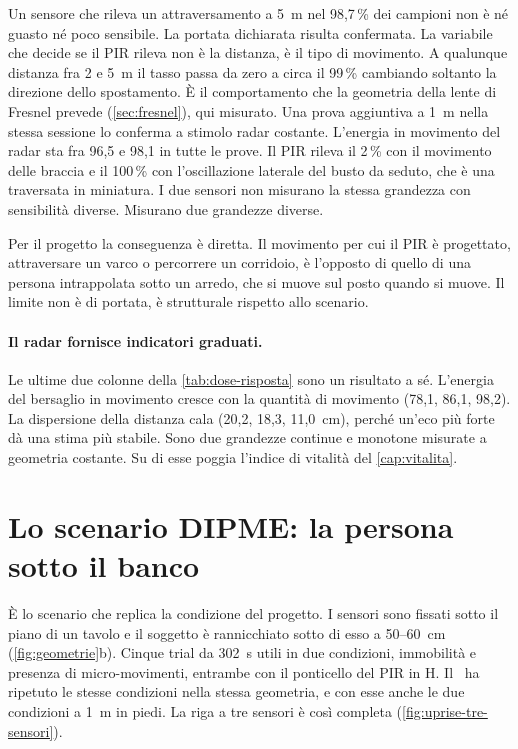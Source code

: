 Un sensore che rileva un attraversamento a 5~m nel 98,7\,\% dei campioni non è né
guasto né poco sensibile. La portata dichiarata risulta confermata. La variabile che
decide se il PIR rileva non è la distanza, è il tipo di movimento. A qualunque
distanza fra 2 e 5~m il tasso passa da zero a circa il 99\,\% cambiando soltanto la
direzione dello spostamento. È il comportamento che la geometria della lente di
Fresnel prevede (\cref{sec:fresnel}), qui misurato. Una prova aggiuntiva a 1~m nella
stessa sessione lo conferma a stimolo radar costante. L'energia in movimento del
radar sta fra 96,5 e 98,1 in tutte le prove. Il PIR rileva il 2\,\% con il movimento
delle braccia e il 100\,\% con l'oscillazione laterale del busto da seduto, che è una
traversata in miniatura. I due sensori non misurano la stessa grandezza con
sensibilità diverse. Misurano due grandezze diverse.

Per il progetto la conseguenza è diretta. Il movimento per cui il PIR è progettato,
attraversare un varco o percorrere un corridoio, è l'opposto di quello di una persona
intrappolata sotto un arredo, che si muove sul posto quando si muove. Il limite non è
di portata, è strutturale rispetto allo scenario.

\paragraph{Il radar fornisce indicatori graduati.} Le ultime due colonne della
\cref{tab:dose-risposta} sono un risultato a sé. L'energia del bersaglio in movimento
cresce con la quantità di movimento (78,1, 86,1, 98,2). La dispersione della distanza
cala (20,2, 18,3, 11,0~cm), perché un'eco più forte dà una stima più stabile. Sono due
grandezze continue e monotone misurate a geometria costante. Su di esse poggia
l'indice di vitalità del \cref{cap:vitalita}.

\section{Lo scenario DIPME: la persona sotto il banco}
\label{sec:sotto-banco}
\label{sec:gate-sotto-banco}

È lo scenario che replica la condizione del progetto. I sensori sono fissati sotto il
piano di un tavolo e il soggetto è rannicchiato sotto di esso a 50--60~cm
(\cref{fig:geometrie}b). Cinque trial da 302~s utili in due condizioni, immobilità e
presenza di micro-movimenti, entrambe con il ponticello del PIR in H. Il \ldc\ ha
ripetuto le stesse condizioni nella stessa geometria, e con esse anche le due
condizioni a 1~m in piedi. La riga a tre sensori è così completa
(\cref{fig:uprise-tre-sensori}).

